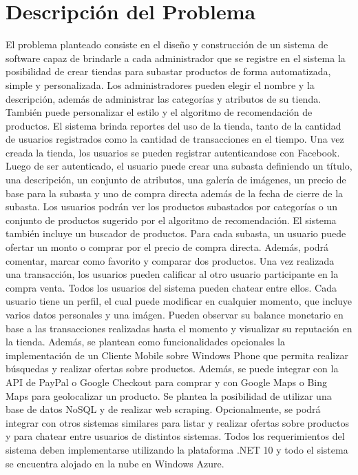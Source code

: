 \documentclass[journal]{IEEEtran}
\begin{document}
\section{Descripción del Problema}
El problema planteado \cite{url:laboratorio} consiste en el diseño y construcción de un sistema de software capaz de brindarle a cada administrador que se registre en el sistema la posibilidad de crear tiendas para subastar productos de forma automatizada, simple y personalizada. Los administradores pueden elegir el nombre y la descripción, además de administrar las categorías y atributos de su tienda. También puede personalizar el estilo y el algoritmo de recomendación de productos. El sistema brinda reportes del uso de la tienda, tanto de la cantidad de usuarios registrados como la cantidad de transacciones en el tiempo.
Una vez creada la tienda, los usuarios se pueden registrar autenticandose con Facebook. Luego de ser autenticado, el usuario puede crear una subasta definiendo un título, una descripción, un conjunto de atributos, una galería de imágenes, un precio de base para la subasta y uno de compra directa además de la fecha de cierre de la subasta.
Los usuarios podrán ver los productos subastados por categorías o un conjunto de productos sugerido por el algoritmo de recomendación. El sistema también incluye un buscador de productos. Para cada subasta, un usuario puede ofertar un monto o comprar por el precio de compra directa. Además, podrá comentar, marcar como favorito y comparar dos productos.
Una vez realizada una transacción, los usuarios pueden calificar al otro usuario participante en la compra venta. Todos los usuarios del sistema pueden chatear entre ellos.
Cada usuario tiene un perfil, el cual puede modificar en cualquier momento, que incluye varios datos personales y una imágen. Pueden observar su balance monetario en base a las transacciones realizadas hasta el momento y visualizar su reputación en la tienda.
Además, se plantean como funcionalidades opcionales la implementación de un Cliente Mobile sobre Windows Phone que permita realizar búsquedas y realizar ofertas sobre productos. Además, se puede integrar con la API de PayPal o Google Checkout para comprar y  con Google Maps o Bing Maps para geolocalizar un producto. Se plantea la posibilidad de utilizar una base de datos NoSQL y de realizar web scraping.
Opcionalmente, se podrá integrar con otros sistemas similares para listar y realizar ofertas sobre productos y para chatear entre usuarios de distintos sistemas.
Todos los requerimientos del sistema deben implementarse utilizando la plataforma .NET 10 y todo el sistema se encuentra alojado en la nube en Windows Azure.
\end{document}
